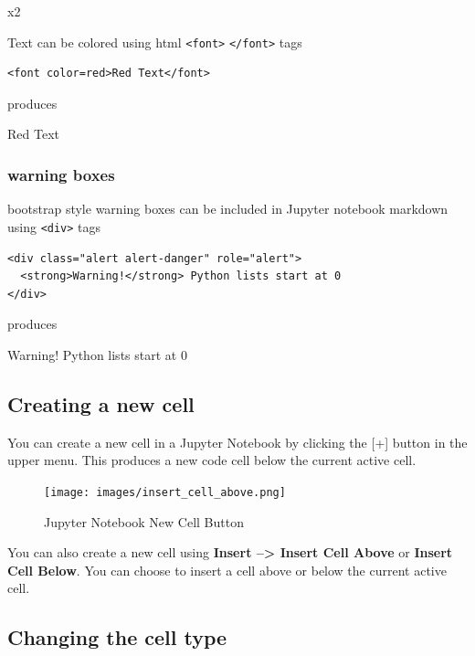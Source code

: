 \documentclass{book}
\begin{document}
x2

Text can be colored using html \lstinline!<font>! \lstinline!</font>!
tags

\begin{lstlisting}
<font color=red>Red Text</font>
\end{lstlisting}

produces

Red Text

\subsubsection{warning boxes}\label{warning-boxes}

bootstrap style warning boxes can be included in Jupyter notebook
markdown using \lstinline!<div>! tags

\begin{lstlisting}
<div class="alert alert-danger" role="alert">
  <strong>Warning!</strong> Python lists start at 0
</div>
\end{lstlisting}

produces

Warning! Python lists start at 0
    




    
        \subsection{Creating a new cell}\label{creating-a-new-cell}

You can create a new cell in a Jupyter Notebook by clicking the {[}+{]}
button in the upper menu. This produces a new code cell below the
current active cell.

\begin{figure}
\centering
\texttt{[image: images/insert\_cell\_above.png]}
\caption{Jupyter Notebook New Cell Button}
\end{figure}

You can also create a new cell using \textbf{Insert --\textgreater{}
Insert Cell Above} or \textbf{Insert Cell Below}. You can choose to
insert a cell above or below the current active cell.
    




    
        \subsection{Changing the cell type}\label{changing-the-cell-type}
\end{document}
